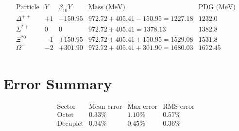 \[
\begin{array}{ccccc}
\text{Particle} & Y & \beta_{10} Y & \text{Mass (MeV)} & \text{PDG (MeV)} \\
\hline
\Delta^{++} & +1 & -150.95 & 972.72{+}405.41{-}150.95 = 1227.18 & 1232.0 \\
\Sigma^{*+} & 0 & 0 & 972.72{+}405.41 = 1378.13 & 1382.8 \\
\Xi^{*0} & -1 & +150.95 & 972.72{+}405.41{+}150.95 = 1529.08 & 1531.8 \\
\Omega^- & -2 & +301.90 & 972.72{+}405.41{+}301.90 = 1680.03 & 1672.45 \\
\end{array}
\]

\section{Error Summary}

\[
\begin{array}{lccc}
\text{Sector} & \text{Mean error} & \text{Max error} & \text{RMS error} \\
\hline
\text{Octet} & 0.33\% & 1.10\% & 0.57\% \\
\text{Decuplet} & 0.34\% & 0.45\% & 0.36\% \\
\end{array}
\]
